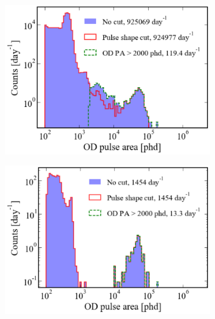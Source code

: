 \begin{figure}[htbp]
    \centering
    \begin{subfigure}{0.49\textwidth}
    \includegraphics[width=\textwidth]{figures/Muons/OD_cuts_pre_coincidenceLZstyle.pdf}
    \caption{}
    \label{fig:ODcut_pre}
    \end{subfigure}
    \begin{subfigure}{0.49\textwidth}
    \centering
    \includegraphics[width=\textwidth]{figures/Muons/OD_cuts_post_coincidenceLZstyle.pdf}
    \caption{}
    \label{fig:ODcut_post}
    \end{subfigure}
    \caption{%
}
\end{figure}
